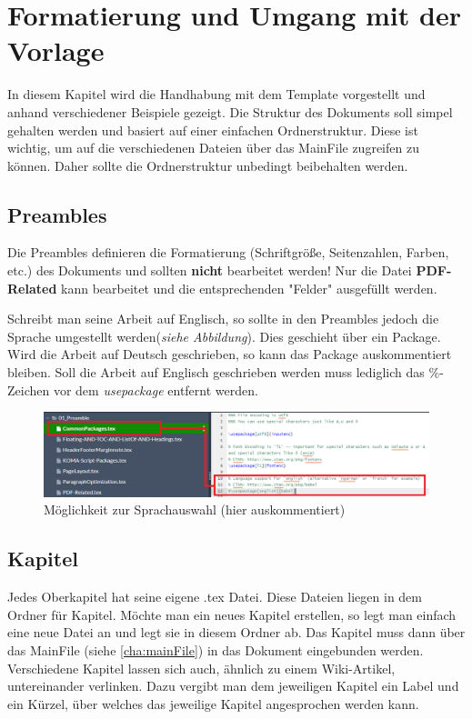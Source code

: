 
\chapter{Formatierung und Umgang mit der Vorlage}
In diesem Kapitel wird die Handhabung mit dem Template vorgestellt und anhand verschiedener Beispiele gezeigt. Die Struktur des Dokuments soll simpel gehalten werden und basiert auf einer einfachen Ordnerstruktur. Diese ist wichtig, um auf die verschiedenen Dateien über das MainFile zugreifen zu können. Daher sollte die Ordnerstruktur unbedingt beibehalten werden.

\section{Preambles}
Die Preambles definieren die Formatierung (Schriftgröße, Seitenzahlen, Farben, etc.) des Dokuments und sollten \textbf{nicht} bearbeitet werden! Nur die Datei \textbf{PDF-Related} kann bearbeitet und die entsprechenden "Felder" ausgefüllt werden. 

Schreibt man seine Arbeit auf Englisch, so sollte in den Preambles jedoch die Sprache umgestellt werden(\emph{siehe Abbildung}). Dies geschieht über ein Package. Wird die Arbeit auf Deutsch geschrieben, so kann das Package auskommentiert bleiben. Soll die Arbeit auf Englisch geschrieben werden muss lediglich das \%-Zeichen vor dem \emph{usepackage} entfernt werden.

\begin{figure}[H]
    \centering
    \includegraphics[width=\textwidth]{03_GraphicFiles/SelectLanguage.PNG}
    \caption{Möglichkeit zur Sprachauswahl (hier auskommentiert)}
    \label{fig:langSel}
\end{figure}

\section{Kapitel}
Jedes Oberkapitel hat seine eigene .tex Datei. Diese Dateien liegen in dem Ordner für Kapitel. Möchte man ein neues Kapitel erstellen, so legt man einfach eine neue Datei an und legt sie in diesem Ordner ab. Das Kapitel muss dann über das MainFile (siehe \ref{cha:mainFile}) in das Dokument eingebunden werden. Verschiedene Kapitel lassen sich auch, ähnlich zu einem Wiki-Artikel, untereinander verlinken. Dazu vergibt man dem jeweiligen Kapitel ein Label und ein Kürzel, über welches das jeweilige Kapitel angesprochen werden kann.


